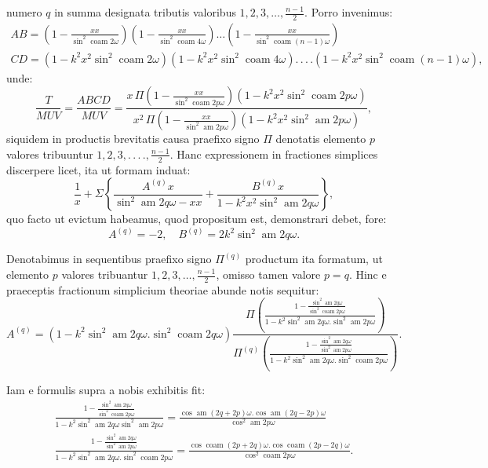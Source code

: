 \documentclass{article}
\begin{document}
numero $q$ in summa designata tributis valoribus $1,2,3,\ldots,\frac{n-1}{2}$. Porro invenimus:
\[
\begin{gathered}
AB=\left(1-\frac{xx}{\sin^{2}\operatorname{coam}2\omega}\right)\left(1-\frac{xx}{\sin^{2}\operatorname{coam}4\omega}\right)\ldots\left(1-\frac{xx}{\sin^{2}\operatorname{coam}(n-1)\omega}\right)\\[1.5ex]
CD=\left(1-k^{2}x^{2}\sin^{2}\operatorname{coam}2\omega\right)\left(1-k^{2}x^{2}\sin^{2}\operatorname{coam}4\omega\right).\,.\,.\,.\left(1-k^{2}x^{2}\sin^{2}\operatorname{coam}(n-1)\omega\right),
\end{gathered}
\]
unde:
\[
\frac{T}{MUV}=\frac{ABCD}{MUV}=\frac{x\,\Pi\left(1-\frac{xx}{\sin^{2}\operatorname{coam}2p\omega}\right)\left(1-k^{2}x^{2}\sin^{2}\operatorname{coam}2p\omega\right)}{x^{2}\,\Pi\left(1-\frac{xx}{\sin^{2}\operatorname{am}2p\omega}\right)\left(1-k^{2}x^{2}\sin^{2}\operatorname{am}2p\omega\right)},
\]
siquidem in productis brevitatis causa praefixo signo $\Pi$ denotatis elemento $p$ valores tribuuntur $1,2,3,.\,.\,.\,.,\frac{n-1}{2}$. Hanc expressionem in fractiones simplices discerpere licet, ita ut formam induat:
\[
\frac{1}{x}+\Sigma\left\{\frac{A^{(q)}x}{\sin^{2}\operatorname{am}2q\omega-xx}+\frac{B^{(q)}x}{1-k^{2}x^{2}\sin^{2}\operatorname{am}2q\omega}\right\},
\]
quo facto ut evictum habeamus, quod propositum est, demonstrari debet, fore:
\[
A^{(q)}=-2,\quad B^{(q)}=2k^{2}\sin^{2}\operatorname{am}2q\omega.
\]

Denotabimus in sequentibus praefixo signo $\Pi^{(q)}$ productum ita formatum, ut elemento $p$ valores tribuantur $1,2,3,\ldots,\frac{n-1}{2}$, omisso tamen valore $p=q$. Hinc e praeceptis fractionum simplicium theoriae abunde notis sequitur:
\[
A^{(q)}=\left(1-k^{2}\sin^{2}\operatorname{am}2q\omega.\sin^{2}\operatorname{coam}2q\omega\right)\frac{\Pi\left(\frac{1-\frac{\sin^{2}\operatorname{am}2q\omega}{\sin^{2}\operatorname{coam}2p\omega}}{1-k^{2}\sin^{2}\operatorname{am}2q\omega.\sin^{2}\operatorname{am}2p\omega}\right)}{\Pi^{(q)}\left(\frac{1-\frac{\sin^{2}\operatorname{am}2q\omega}{\sin^{2}\operatorname{am}2p\omega}}{1-k^{2}\sin^{2}\operatorname{am}2q\omega.\sin^{2}\operatorname{coam}2p\omega}\right)}.
\]

Iam e formulis supra a nobis exhibitis fit:
\[
\begin{gathered}
\frac{1-\frac{\sin^{2}\operatorname{am}2q\omega}{\sin^{2}\operatorname{coam}2p\omega}}{1-k^{2}\sin^{2}\operatorname{am}2q\omega\sin^{2}\operatorname{am}2p\omega}=\frac{\cos\operatorname{am}(2q+2p)\omega.\cos\operatorname{am}(2q-2p)\omega}{\cos^{2}\operatorname{am}2p\omega}\\[1.5ex]
\frac{1-\frac{\sin^{2}\operatorname{am}2q\omega}{\sin^{2}\operatorname{am}2p\omega}}{1-k^{2}\sin^{2}\operatorname{am}2q\omega.\sin^{2}\operatorname{coam}2p\omega}=\frac{\cos\operatorname{coam}(2p+2q)\omega.\cos\operatorname{coam}(2p-2q)\omega}{\cos^{2}\operatorname{coam}2p\omega}.
\end{gathered}
\]
\end{document}
